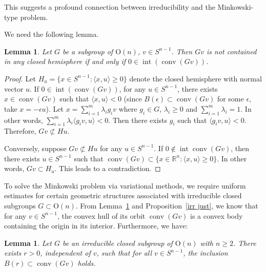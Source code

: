 \documentclass[12pt, reqno]{amsart}
\newtheorem{lemma}[theorem]{Lemma}
\theoremstyle{definition}
\theoremstyle{remark}
\numberwithin{equation}{section}
\newcommand{\conv}{\operatorname{conv}}
\newcommand{\Rn}{\mathbb{R}^{n}}
\newcommand{\Sn}{S^{n-1}}
\newcommand{\On}{\mathrm{O}(n)}
\begin{document}
This suggests a profound connection between irreducibility and the Minkowski-type problem.

		We need the following lemma.
	\begin{lemma}\label{hemi just}
		Let $G$ be a subgroup of $\On$, $v\in \Sn$. Then
		$Gv$ is not contained in any closed hemisphere  if and only if $0\in \operatorname{int} (\conv (Gv))$.
	\end{lemma}
	
	\begin{proof}
		Let	$H_{u}=\{x\in\Sn: \langle x,u \rangle\ge0\}$ denote the closed hemisphere with normal vector $u$. If  $0\in \operatorname{int} (\conv (Gv))$, for any $u\in\Sn$, there exists $x\in \conv(Gv)$ such that $\langle x,u\rangle<0$ (since $B(\epsilon)\subset \conv (Gv)$ for some $\epsilon$, take $x=-\epsilon u$). Let $x=\sum_{i=1}^{m}\lambda_{i}g_{i}v$ where \(g_{i}\in G\),  \(\lambda_{i}\ge0\) and \(\sum_{i=1}^{m}\lambda_{i}=1\). In other words,
		$\sum_{i=1}^{m} \lambda_{i}\langle g_{i}v, u \rangle <0$. Then there exists $g_{i}$ such that $\langle g_{i}v, u \rangle <0$. Therefore, $Gv\not\subset Hu$.
		
	Conversely,	suppose $Gv\not\subset Hu$ for any $u\in\Sn$. If $0\notin \operatorname{int}\conv(Gv)$, then there exists $u\in\Sn$ such that $\conv(Gv)\subset \{x\in\Rn:\langle x,u\rangle\ge0\}$. In other words, $Gv\subset H_{u}$. This leads to a contradiction.
	\end{proof}
	
	
			To solve the Minkowski problem via variational methods, we require uniform estimates for certain geometric structures associated with irreducible closed subgroups $G\subset \On$. From Lemma~\ref{hemi just} and Proposition~\ref{irr just}, we know that for any  $v \in \Sn$, the convex hull of its orbit $\operatorname{conv}(Gv)$  is a convex body containing the origin in its interior. Furthermore, we have:
	
	\begin{lemma}\label{int estimate}
		Let $G$ be an irreducible closed subgroup of $\On$ with $n\ge2$. There exists $r > 0$, independent of $v$, such that for all $v \in S^{n-1}$, the inclusion
		$B(r)\subset \conv (Gv)$ holds.  
	\end{lemma}
	
\end{document}
